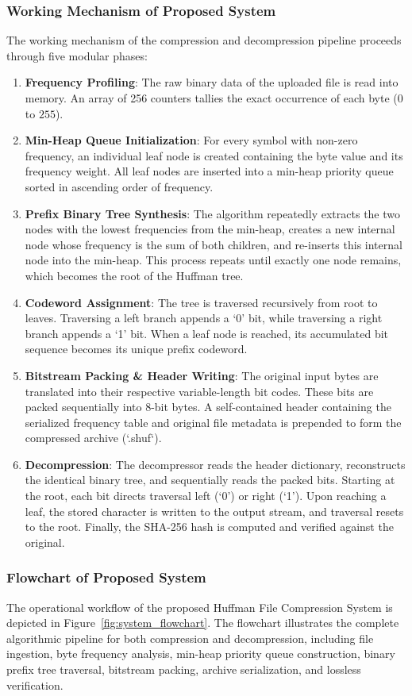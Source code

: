 \documentclass[12pt,a4paper]{article}
\begin{document}
\subsubsection{Working Mechanism of Proposed System}
The working mechanism of the compression and decompression pipeline proceeds through five modular phases:
\begin{enumerate}
    \item \textbf{Frequency Profiling}: The raw binary data of the uploaded file is read into memory. An array of 256 counters tallies the exact occurrence of each byte ($0$ to $255$).
    \item \textbf{Min-Heap Queue Initialization}: For every symbol with non-zero frequency, an individual leaf node is created containing the byte value and its frequency weight. All leaf nodes are inserted into a min-heap priority queue sorted in ascending order of frequency.
    \item \textbf{Prefix Binary Tree Synthesis}: The algorithm repeatedly extracts the two nodes with the lowest frequencies from the min-heap, creates a new internal node whose frequency is the sum of both children, and re-inserts this internal node into the min-heap. This process repeats until exactly one node remains, which becomes the root of the Huffman tree.
    \item \textbf{Codeword Assignment}: The tree is traversed recursively from root to leaves. Traversing a left branch appends a `0' bit, while traversing a right branch appends a `1' bit. When a leaf node is reached, its accumulated bit sequence becomes its unique prefix codeword.
    \item \textbf{Bitstream Packing \& Header Writing}: The original input bytes are translated into their respective variable-length bit codes. These bits are packed sequentially into 8-bit bytes. A self-contained header containing the serialized frequency table and original file metadata is prepended to form the compressed archive (`.shuf`).
    \item \textbf{Decompression}: The decompressor reads the header dictionary, reconstructs the identical binary tree, and sequentially reads the packed bits. Starting at the root, each bit directs traversal left (`0') or right (`1'). Upon reaching a leaf, the stored character is written to the output stream, and traversal resets to the root. Finally, the SHA-256 hash is computed and verified against the original.
\end{enumerate}

\subsubsection{Flowchart of Proposed System}
The operational workflow of the proposed Huffman File Compression System is depicted in Figure~\ref{fig:system_flowchart}. The flowchart illustrates the complete algorithmic pipeline for both compression and decompression, including file ingestion, byte frequency analysis, min-heap priority queue construction, binary prefix tree traversal, bitstream packing, archive serialization, and lossless verification.
\end{document}
